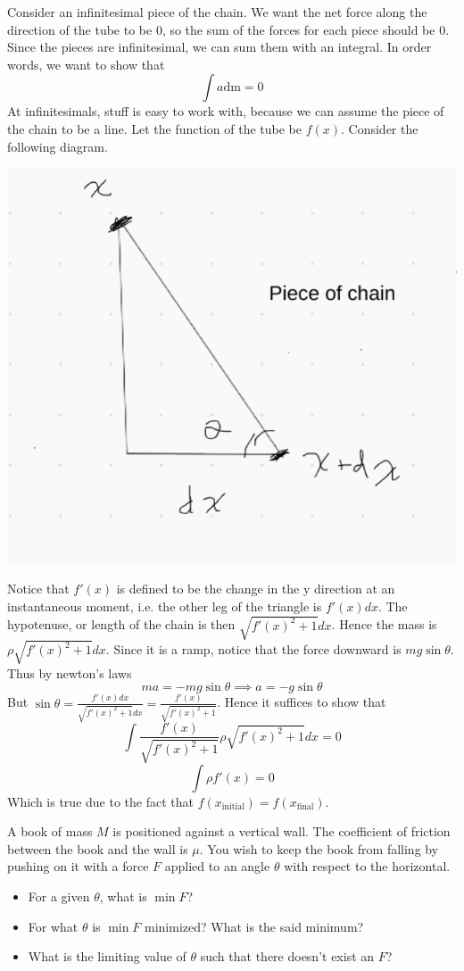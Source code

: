 \documentclass[11pt]{scrartcl}
\newcommand{\ca}[1]{\mathrm{#1}}
\begin{document}
\begin{soln}
  Consider an infinitesimal piece of the chain. We want the net force along
  the direction of the tube to be $0$, so the sum of the forces
  for each piece should be $0$. Since the pieces are infinitesimal,
  we can sum them with an integral. In order words, we want to show that
  $$\int a \ca{dm}=0$$
  At infinitesimals, stuff is easy to work with, because we can assume the
  piece of the chain to be a line. Let the function of the tube be $f(x)$.
  Consider the following diagram.
  \begin{center}\includegraphics[scale=0.3]{Diagram1.png}\end{center}
    Notice that $f'(x)$ is defined to be the change in the y direction at
    an instantaneous moment, i.e. the other leg of the triangle is $f'(x)dx$.
    The hypotenuse, or length of the chain is then $\sqrt{f'(x)^2+1}dx$.
    Hence the mass is $\rho\sqrt{f'(x)^2+1}dx$.
    Since it is a ramp, notice that the force downward is $mg\sin\theta$.
    Thus by newton's laws
    $$ma=-mg\sin\theta\implies a=-g\sin\theta$$
    But $\sin\theta=\frac{f'(x)dx}{\sqrt{f'(x)^2+1}dx}=\frac{f'(x)}{\sqrt{f'(x)^2+1}}$.
    Hence it suffices to show that
    $$\int \frac{f'(x)}{\sqrt{f'(x)^2+1}}\rho\sqrt{f'(x)^2+1}dx=0$$
    $$\int \rho f'(x)=0$$
    Which is true due to the fact that $f(x_{\ca{initial}})=f(x_{\ca{final}})$.
\end{soln}
\begin{example}
  A book of mass $M$ is positioned against a vertical wall. The coefficient
  of friction between the book and the wall is $\mu$. You wish to keep the
  book from falling by pushing on it with a force $F$ applied to an angle
  $\theta$ with respect to the horizontal.
  \begin{itemize}
    \item For a given $\theta$, what is $\min F$?
    \item For what $\theta$ is $\min F$ minimized? What is the said minimum?
    \item What is the limiting value of $\theta$ such that there doesn't
      exist an $F$?
  \end{itemize}
\end{example}
\end{document}

